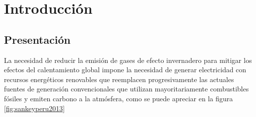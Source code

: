 

\chapter{Introducción}


\section{Presentación} %

La necesidad de reducir la emisión de gases de efecto invernadero para mitigar los efectos del calentamiento global impone la necesidad de generar electricidad con recursos energéticos renovables que reemplacen progresivamente las actuales fuentes de generación convencionales que utilizan mayoritariamente combustibles fósiles y emiten carbono a la atmósfera, como se puede apreciar en la figura \ref{fig:sankeyperu2013}

